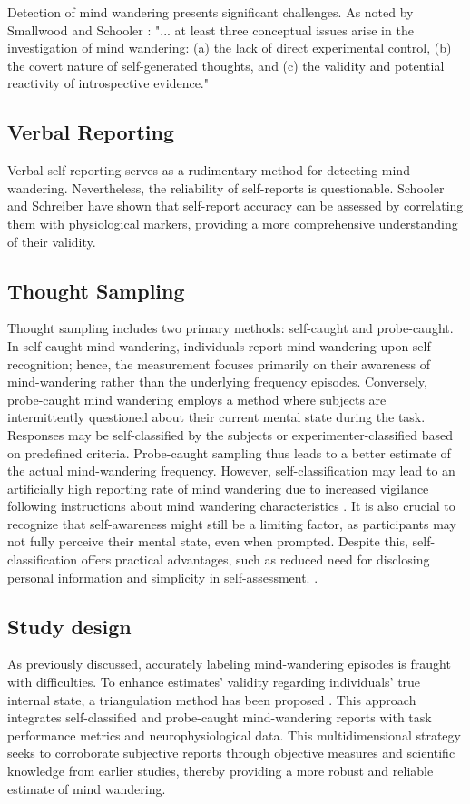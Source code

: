 Detection of mind wandering presents significant challenges. As noted by Smallwood and Schooler \cite{SmallwoodSchooler2015}: 
"... at least three conceptual issues arise in the investigation of mind wandering: (a) the lack of direct experimental control, (b) the covert nature of self-generated thoughts, and (c) the validity and potential reactivity of introspective evidence."

\subsection{Verbal Reporting}
Verbal self-reporting serves as a rudimentary method for detecting mind wandering. Nevertheless, the reliability of self-reports is questionable. Schooler and Schreiber have shown that self-report accuracy can be assessed by correlating them with physiological markers, providing a more comprehensive understanding of their validity\cite{Schooler2004}.

\subsection{Thought Sampling}
Thought sampling includes two primary methods: self-caught and probe-caught. In self-caught mind wandering, individuals report mind wandering upon self-recognition; hence, the measurement focuses primarily on their awareness of mind-wandering rather than the underlying frequency episodes. Conversely, probe-caught mind wandering employs a method where subjects are intermittently questioned about their current mental state during the task. Responses may be self-classified by the subjects or experimenter-classified based on predefined criteria. Probe-caught sampling thus leads to a better estimate of the actual mind-wandering frequency. However, self-classification may lead to an artificially high reporting rate of mind wandering due to increased vigilance following instructions about mind wandering characteristics \cite{Giambra1995}. It is also crucial to recognize that self-awareness might still be a limiting factor, as participants may not fully perceive their mental state, even when prompted. Despite this, self-classification offers practical advantages, such as reduced need for disclosing personal information and simplicity in self-assessment. \cite{SmallwoodSchooler2006}.

\subsection{Study design}
\label{subsec: study_design}
As previously discussed, accurately labeling mind-wandering episodes is fraught with difficulties. To enhance estimates' validity regarding individuals' true internal state, a triangulation method has been proposed \cite{SmallwoodSchooler2015}. This approach integrates self-classified and probe-caught mind-wandering reports with task performance metrics and neurophysiological data. This multidimensional strategy seeks to corroborate subjective reports through objective measures and scientific knowledge from earlier studies, thereby providing a more robust and reliable estimate of mind wandering.


